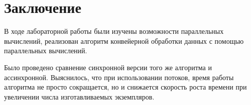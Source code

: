 \chapter*{Заключение}

В ходе лабораторной работы были изучены возможности параллельных вычислений, реализован алгоритм конвейерной обработки данных
с помощью параллельных вычислений.

Было проведено сравнение синхронной версии того же алгоритма и ассинхронной. Выяснилось, что при использовании потоков, время работы алгоритма не просто сокращается, но и снижается скорость роста времени при увеличении числа изготавливаемых экземпляров.
